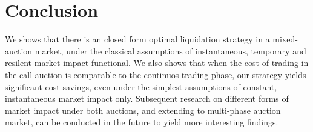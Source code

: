 \documentclass{article}
\begin{document}
\section{Conclusion}\label{secConclusion}
We shows that there is an closed form optimal liquidation strategy in a mixed-auction market, under the classical assumptions of instantaneous, temporary and resilent market impact functional. We also shows that when the cost of trading in the call auction is comparable to the continuos trading phase, our strategy yields significant cost savings, even under the simplest assumptions of constant, instantaneous market impact only. Subsequent research on different forms of market impact under both auctions, and extending to multi-phase auction market, can be conducted in the future to yield more interesting findings.



\end{document}
